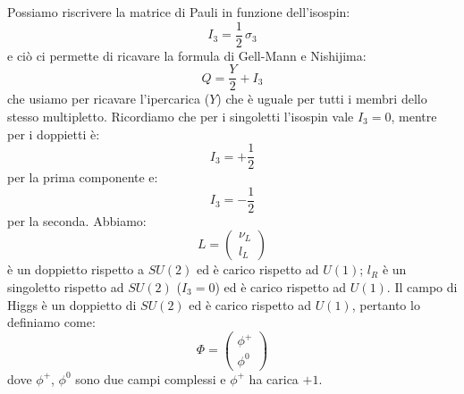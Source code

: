 Possiamo riscrivere la matrice di Pauli in funzione dell'isospin:
\begin{equation}
    I_3 = \frac{1}{2}\, \sigma_3
\end{equation}
e ciò ci permette di ricavare la formula di Gell-Mann e Nishijima:
\begin{equation}
    Q = \frac{Y}{2} + I_3
\end{equation}
che usiamo per ricavare l'ipercarica ($Y$) che è uguale per tutti i membri dello stesso multipletto. Ricordiamo che per i singoletti l'isospin vale $I_3 = 0$, mentre per i doppietti è:
\begin{equation}
    I_3 = +\frac{1}{2}
\end{equation}
per la prima componente e:
\begin{equation}
    I_3 = -\frac{1}{2}
\end{equation}
per la seconda. Abbiamo:
\begin{equation}
    L = \begin{pmatrix}
        \nu_L \\
        l_L
    \end{pmatrix}
\end{equation}
è un doppietto rispetto a $SU(2)$ ed è carico rispetto ad $U(1)$; $l_R$ è un singoletto rispetto ad $SU(2)$ ($I_3=0$) ed è carico rispetto ad $U(1)$. Il campo di Higgs è un doppietto di $SU(2)$ ed è carico rispetto ad $U(1)$, pertanto lo definiamo come:
\begin{equation}
    \Phi = \begin{pmatrix}
        \phi^+ \\
        \phi^0
    \end{pmatrix}
\end{equation}
dove $\phi^+$, $\phi^0$ sono due campi complessi e $\phi^+$ ha carica $+1$. \\

